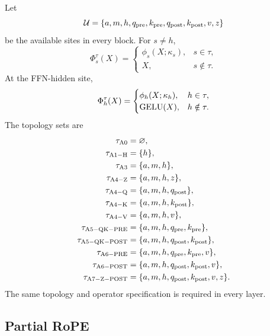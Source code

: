 Let
\begin{equation}
    \mathcal U=
    \{a,m,h,q_{\mathrm{pre}},k_{\mathrm{pre}},q_{\mathrm{post}},k_{\mathrm{post}},v,z\}
    \label{eq:available-sites}
\end{equation}
be the available sites in every block. For $s\ne h$,
\begin{equation}
    \Phi_s^\tau(X)=
    \begin{cases}
        \phi_s(X;\kappa_s),&s\in\tau,\\
        X,&s\notin\tau.
    \end{cases}
    \label{eq:activation-map-general}
\end{equation}
At the FFN-hidden site,
\begin{equation}
    \Phi_h^\tau(X)=
    \begin{cases}
        \phi_h(X;\kappa_h),&h\in\tau,\\
        \operatorname{GELU}(X),&h\notin\tau.
    \end{cases}
    \label{eq:activation-map-hidden}
\end{equation}
The topology sets are
\begin{align*}
    \tau_{\mathrm{A0}}&=\varnothing,\\
    \tau_{\mathrm{A1-H}}&=\{h\},\\
    \tau_{\mathrm{A3}}&=\{a,m,h\},\\
    \tau_{\mathrm{A4-Z}}&=\{a,m,h,z\},\\
    \tau_{\mathrm{A4-Q}}&=\{a,m,h,q_{\mathrm{post}}\},\\
    \tau_{\mathrm{A4-K}}&=\{a,m,h,k_{\mathrm{post}}\},\\
    \tau_{\mathrm{A4-V}}&=\{a,m,h,v\},\\
    \tau_{\mathrm{A5-QK-PRE}}&=\{a,m,h,q_{\mathrm{pre}},k_{\mathrm{pre}}\},\\
    \tau_{\mathrm{A5-QK-POST}}&=\{a,m,h,q_{\mathrm{post}},k_{\mathrm{post}}\},\\
    \tau_{\mathrm{A6-PRE}}&=\{a,m,h,q_{\mathrm{pre}},k_{\mathrm{pre}},v\},\\
    \tau_{\mathrm{A6-POST}}&=\{a,m,h,q_{\mathrm{post}},k_{\mathrm{post}},v\},\\
    \tau_{\mathrm{A7-Z-POST}}&=\{a,m,h,q_{\mathrm{post}},k_{\mathrm{post}},v,z\}.
\end{align*}
The same topology and operator specification is required in every layer.

\subsection{Partial RoPE}

